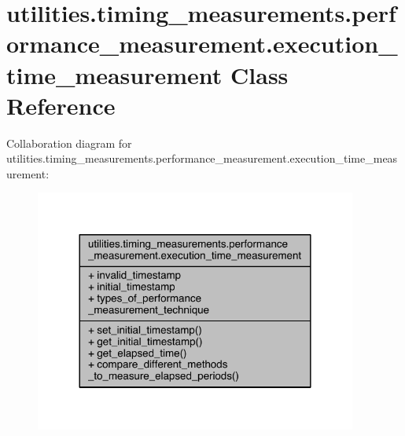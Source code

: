 \hypertarget{classutilities_1_1timing__measurements_1_1performance__measurement_1_1execution__time__measurement}{}\section{utilities.\+timing\+\_\+measurements.\+performance\+\_\+measurement.\+execution\+\_\+time\+\_\+measurement Class Reference}
\label{classutilities_1_1timing__measurements_1_1performance__measurement_1_1execution__time__measurement}


Collaboration diagram for utilities.\+timing\+\_\+measurements.\+performance\+\_\+measurement.\+execution\+\_\+time\+\_\+measurement\+:
\nopagebreak
\begin{figure}[H]
\begin{center}
\leavevmode
\includegraphics[width=300pt]{db/db8/classutilities_1_1timing__measurements_1_1performance__measurement_1_1execution__time__measurement__coll__graph}
\end{center}
\end{figure}
